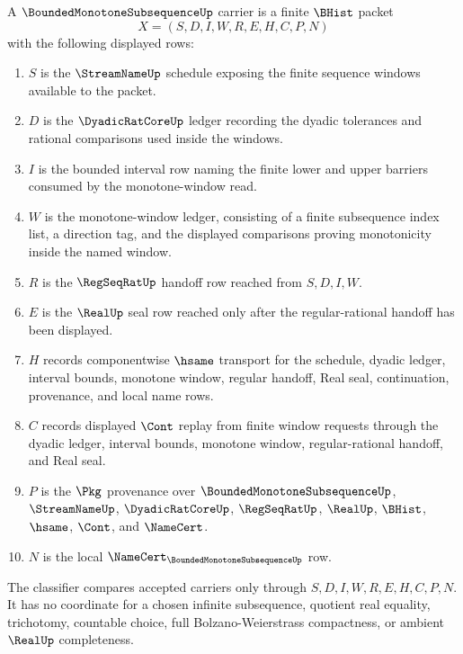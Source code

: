 \begin{definition}
\label{def:bounded-monotone-subsequence-carrier}
A $\BoundedMonotoneSubsequenceUp$ carrier is a finite $\BHist$ packet
$$
X=(S,D,I,W,R,E,H,C,P,N)
$$
with the following displayed rows:
\begin{enumerate}
\item $S$ is the $\StreamNameUp$ schedule exposing the finite sequence windows available to the packet.
\item $D$ is the $\DyadicRatCoreUp$ ledger recording the dyadic tolerances and rational comparisons used inside the windows.
\item $I$ is the bounded interval row naming the finite lower and upper barriers consumed by the monotone-window read.
\item $W$ is the monotone-window ledger, consisting of a finite subsequence index list, a direction tag, and the displayed comparisons proving monotonicity inside the named window.
\item $R$ is the $\RegSeqRatUp$ handoff row reached from $S,D,I,W$.
\item $E$ is the $\RealUp$ seal row reached only after the regular-rational handoff has been displayed.
\item $H$ records componentwise $\hsame$ transport for the schedule, dyadic ledger, interval bounds, monotone window, regular handoff, Real seal, continuation, provenance, and local name rows.
\item $C$ records displayed $\Cont$ replay from finite window requests through the dyadic ledger, interval bounds, monotone window, regular-rational handoff, and Real seal.
\item $P$ is the $\Pkg$ provenance over $\BoundedMonotoneSubsequenceUp$, $\StreamNameUp$, $\DyadicRatCoreUp$, $\RegSeqRatUp$, $\RealUp$, $\BHist$, $\hsame$, $\Cont$, and $\NameCert$.
\item $N$ is the local $\NameCert_{\BoundedMonotoneSubsequenceUp}$ row.
\end{enumerate}
The classifier compares accepted carriers only through $S,D,I,W,R,E,H,C,P,N$. It has no coordinate for a chosen infinite subsequence, quotient real equality, trichotomy, countable choice, full Bolzano-Weierstrass compactness, or ambient $\RealUp$ completeness.
\end{definition}

